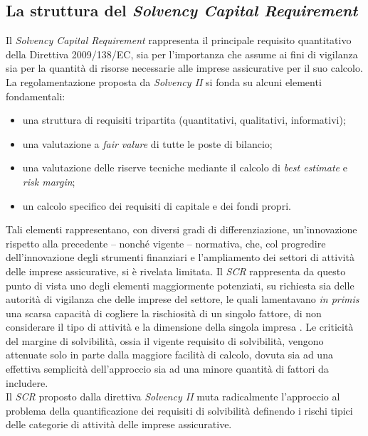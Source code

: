 \subsection{La struttura del {\itshape Solvency Capital Requirement}}
\label{subs:strutturascr}
Il {\itshape Solvency Capital Requirement} rappresenta il principale requisito quantitativo della Direttiva 2009/138/EC, sia per l'importanza che assume ai fini di vigilanza sia per la quantità di risorse necessarie alle imprese assicurative per il suo calcolo. La regolamentazione proposta da {\itshape Solvency II} si fonda su alcuni elementi fondamentali:
\begin{itemize}
\item una struttura di requisiti tripartita (quantitativi, qualitativi, informativi);
\item una valutazione a {\itshape fair valure} di tutte le poste di bilancio;
\item una valutazione delle riserve tecniche mediante il calcolo di {\itshape best estimate} e {\itshape risk margin};
\item un calcolo specifico dei requisiti di capitale e dei fondi propri.
\end{itemize}
Tali elementi rappresentano, con diversi gradi di differenziazione, un'innovazione rispetto alla precedente -- nonché vigente -- normativa, che, col progredire dell'innovazione degli strumenti finanziari e l'ampliamento dei settori di attività delle imprese assicurative, si è rivelata limitata.
Il {\itshape SCR} rappresenta da questo punto di vista uno degli elementi maggiormente potenziati, su richiesta sia delle autorità di vigilanza che delle imprese del settore, le quali lamentavano {\itshape in primis} una scarsa capacità di cogliere la rischiosità di un singolo fattore, di non considerare il tipo di attività e la dimensione della singola impresa \cite{cappiellorisk}. Le criticità del margine di solvibilità, ossia il vigente requisito di solvibilità, vengono attenuate solo in parte dalla maggiore facilità di calcolo, dovuta sia ad una effettiva semplicità dell'approccio sia ad una minore quantità di fattori da includere. \\
Il {\itshape SCR} proposto dalla direttiva {\itshape Solvency II} muta radicalmente l'approccio al problema della quantificazione dei requisiti di solvibilità definendo i rischi tipici delle categorie di attività delle imprese assicurative.

